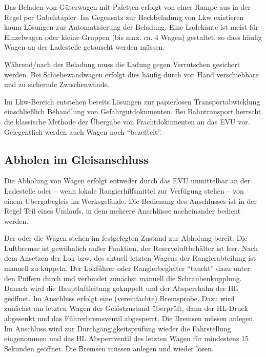 Das Beladen von Güterwagen mit Paletten erfolgt von einer Rampe aus in der Regel per Gabelstapler. Im Gegensatz zur Heckbeladung von Lkw existieren kaum Lösungen zur Automatisierung der Beladung. Eine Ladekante ist meist für Einzelwagen oder kleine Gruppen (bis max. ca. 4 Wagen) gestaltet, so dass häufig Wagen an der Ladestelle getauscht werden müssen.

Während/nach der Beladung muss die Ladung gegen Verrutschen gesichert werden. Bei Schiebewandwagen erfolgt dies häufig durch von Hand verschiebbare und zu sichernde Zwischenwände.
 
Im Lkw-Bereich entstehen bereits Lösungen zur papierlosen Transportabwicklung einschließlich Behandlung von Gefahrgutdokumenten. Bei Bahntransport herrscht die klassische Methode der Übergabe von Frachtdokumenten an das EVU vor. Gelegentlich werden auch Wagen noch "`bezettelt"'.





\subsection{Abholen im Gleisanschluss}
Die Abholung von Wagen erfolgt entweder durch das EVU unmittelbar an der Ladestelle oder -- wenn lokale Rangierhilfsmittel zur Verfügung stehen -- von einem Übergabegleis im Werksgelände. Die Bedienung des Anschlusses ist in der Regel Teil eines Umlaufs, in dem mehrere Anschlüsse nacheinander bedient werden. 

Der oder die Wagen stehen im festgelegten Zustand zur Abholung bereit. Die Luftbremse ist gewöhnlich außer Funktion, der Reserveluftbehälter ist leer. Nach dem Ansetzen der Lok bzw. des aktuell letzten Wagens der Rangierabteilung ist manuell zu kuppeln. Der Lokführer oder Rangierbegleiter "`taucht"' dazu unter den Puffern durch und verbindet zunächst manuell die Schraubenkupplung. Danach wird die Hauptluftleitung gekuppelt und der Absperrhahn der HL geöffnet. Im Anschluss erfolgt eine (vereinfachte) Bremsprobe. Dazu wird zunächst am letzten Wagen der Gelöstzustand überprüft, dann der HL-Druck abgesenkt und das Führerbremsventil abgesperrt. Die Bremsen müssen anlegen. Im Anschluss wird zur Durchgängigkeitsprüfung wieder die Fahrstellung eingenommen und das HL Absperrventil des letzten Wagen für mindestens 15 Sekunden geöffnet. Die Bremsen müssen anlegen und wieder lösen.

